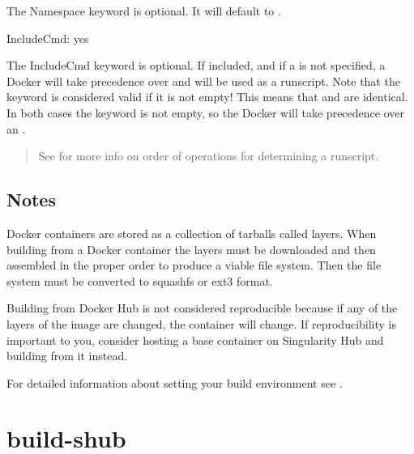 \documentclass[letterpaper,10pt,english]{sphinxmanual}
\begin{document}
The Namespace keyword is optional. It will default to .

%
\begin{sphinxVerbatim}[commandchars=\\\{\}]
IncludeCmd: yes
\end{sphinxVerbatim}

The IncludeCmd keyword is optional. If included, and if a  is not specified, a Docker  will take precedence over 
and will be used as a runscript. Note that the  keyword is considered valid if it is not empty! This means that
 and  are identical. In both cases the  keyword is not empty, so the Docker  will take precedence
over an .
\begin{quote}

See {\hyperref[\detokenize{singularity_and_docker:singularity-and-docker}]{}} for more info on order of operations for determining a runscript.
\end{quote}


\subsection{Notes}
\label{\detokenize{appendix:notes}}
Docker containers are stored as a collection of tarballs called layers. When building from a Docker container the layers must be downloaded and then
assembled in the proper order to produce a viable file system. Then the file system must be converted to squashfs or ext3 format.

Building from Docker Hub is not considered reproducible because if any of the layers of the image are changed, the container will change.
If reproducibility is important to you, consider hosting a base container on Singularity Hub and building from it instead.

For detailed information about setting your build environment see {\hyperref[\detokenize{build_environment:build-environment}]{}}.


\section{build-shub}
\label{\detokenize{appendix:build-shub}}\label{\detokenize{appendix:id2}}
\end{document}
